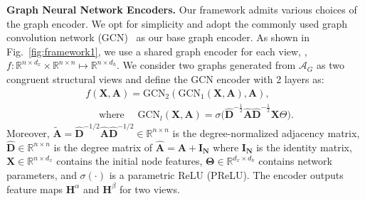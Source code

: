 \vspace{0.1cm}
\noindent\textbf{Graph Neural Network Encoders.} 
Our framework admits various choices of the graph encoder. We opt for simplicity and adopt the commonly used graph convolution network (GCN)~\cite{kipf2016semi} as our base graph encoder. As shown in Fig.~\ref{fig:framework1}, we use a shared graph encoder for each view, \ie, $f: \mathbb{R}^{n \times d_{x}} \times \mathbb{R}^{n \times n}\longmapsto\mathbb{R}^{n \times d_{h}}$. We consider two graphs generated from $\mathcal{A}_G$  as two congruent structural views and define the GCN encoder with 2 layers as: 
 \begin{equation}
    \begin{aligned}
    &f(\mathbf{X}, \mathbf{A})=\mathrm{GCN}_{2}\left (\mathrm{GCN}_{1} (\mathbf{X}, \mathbf{A}), \mathbf{A}\right),\\
    &\quad\text{ where }\quad 
    \mathrm{GCN}_{l} (\mathbf{X}, \mathbf{A})=\sigma\big(\hat{\mathbf{D}}^{-\frac{1}{2}} \hat{\mathbf{A}} \hat{\mathbf{D}}^{-\frac{1}{2}} \mathbf{X} \Theta \big).
    \end{aligned}
\end{equation}
Moreover, $\tilde{\mathbf{A}}=\hat{\mathbf{D}}^{-1 / 2} \hat{\mathbf{A}} \hat{\mathbf{D}}^{-1 / 2} \in \mathbb{R}^{n \times n}$ is the degree-normalized adjacency matrix, $\hat{\mathbf{D}} \in \mathbb{R}^{n \times n}$ is the degree matrix of $\hat{\mathbf{A}}=\mathbf{A}+\mathbf{I}_{\mathbf{N}}$ where $\mathbf{I}_{\mathbf{N}}$ is the identity matrix, $\mathbf{X} \in \mathbb{R}^{n \times d_{x}}$ contains the initial node features, $\boldsymbol{\Theta} \in \mathbb{R}^{d_{x} \times d_{h}}$ contains network parameters, and $\sigma(\cdot)$ is a parametric ReLU (PReLU). %
The encoder outputs feature maps $\mathbf{H}^\alpha$ and $\mathbf{H}^\beta$ for two views.

